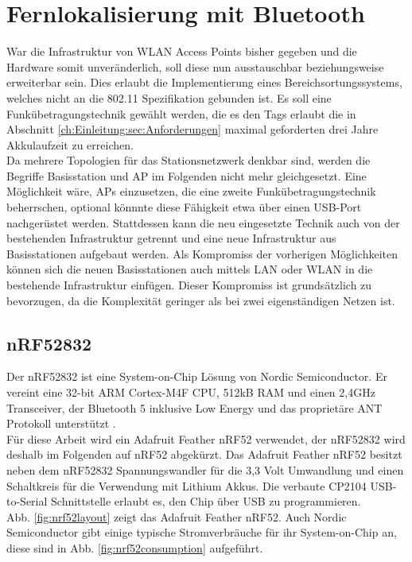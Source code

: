 \chapter{Fernlokalisierung mit Bluetooth}
\label{ch:phase3}
War die Infrastruktur von WLAN Access Points bisher gegeben und die Hardware somit unveränderlich, soll diese nun ausstauschbar beziehungsweise erweiterbar sein.
Dies erlaubt die Implementierung eines Bereichsortungssystems, welches nicht an die 802.11 Spezifikation gebunden ist.
Es soll eine Funkübetragungstechnik gewählt werden, die es den Tags erlaubt die in Abschnitt \ref{ch:Einleitung:sec:Anforderungen} maximal geforderten drei Jahre Akkulaufzeit zu erreichen.\\
Da mehrere Topologien für das Stationsnetzwerk denkbar sind, werden die Begriffe Basisstation und AP im Folgenden nicht mehr gleichgesetzt.
Eine Möglichkeit wäre, APs einzusetzen, die eine zweite Funkübetragungstechnik beherrschen, optional könnnte diese Fähigkeit etwa über einen USB-Port nachgerüstet werden.
Stattdessen kann die neu eingesetzte Technik auch von der bestehenden Infrastruktur getrennt und eine neue Infrastruktur aus Basisstationen aufgebaut werden.
Als Kompromiss der vorherigen Möglichkeiten können sich die neuen Basisstationen auch mittels LAN oder WLAN in die bestehende Infrastruktur einfügen. 
Dieser Kompromiss ist grundsätzlich zu bevorzugen, da die Komplexität geringer als bei zwei eigenständigen Netzen ist.

\section{nRF52832}
Der nRF52832 ist eine System-on-Chip Lösung von Nordic Semiconductor.
Er vereint eine 32-bit ARM Cortex-M4F CPU, 512kB RAM und einen 2,4GHz Transceiver, der Bluetooth 5 inklusive Low Energy und das proprietäre ANT Protokoll unterstützt \cite{nordic2017nrf}.\\
Für diese Arbeit wird ein Adafruit Feather nRF52 verwendet, der nRF52832 wird deshalb im Folgenden auf nRF52 abgekürzt.
Das Adafruit Feather nRF52 besitzt neben dem nRF52832 Spannungswandler für die 3,3 Volt Umwandlung und einen Schaltkreis für die Verwendung mit Lithium Akkus. Die verbaute CP2104 USB-to-Serial Schnittstelle erlaubt es, den Chip über USB zu programmieren.\\
Abb. \ref{fig:nrf52layout} zeigt das Adafruit Feather nRF52.
Auch Nordic Semiconductor gibt einige typische Stromverbräuche für ihr System-on-Chip an, diese sind in Abb. \ref{fig:nrf52consumption} aufgeführt.

